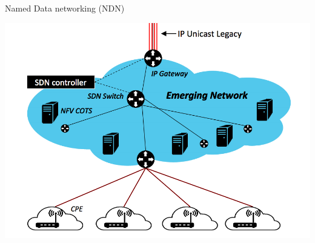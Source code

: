 \documentclass[8pt]{beamer}
\newcommand{\1}{\mathbbm 1}
\begin{document}
\begin{frame}{Named Data networking (NDN)}
{\begin{itemize}
\begin{itemize}
\begin{center}
\includegraphics[scale=0.28]{figures/sdn.png}
\end{center}



\end{itemize}
\end{itemize} 
}




\end{frame}
\end{document}
